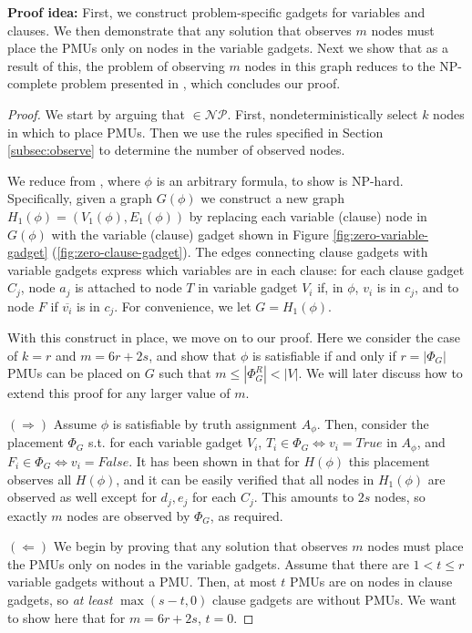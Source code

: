 {\bf Proof idea:} First, we construct problem-specific gadgets for variables and clauses. We then demonstrate that any solution that observes $m$ nodes must place the PMUs only on nodes in the variable gadgets. Next we show that as a result of this, the problem of observing $m$ nodes in this graph reduces to the NP-complete problem presented in \cite{Brueni05}, which concludes our proof.

\begin{proof}
We start by arguing that \maxinc $\in \mathcal{NP}$. First, nondeterministically select $k$ nodes in which to place PMUs. Then we use the rules specified in Section \ref{subsec:observe} to determine
the number of observed nodes. 

We reduce from \sats, where $\phi$ is an arbitrary \sat formula, to show \maxinc is NP-hard.
Specifically, given a graph $G(\phi)$ we construct a new graph $H_1(\phi) = (V_1(\phi), E_1(\phi))$ by replacing each variable 
(clause) node in $G(\phi)$ with the variable (clause) gadget shown in Figure \ref{fig:zero-variable-gadget} (\ref{fig:zero-clause-gadget}). The edges connecting clause gadgets 
with variable gadgets express which variables are in each clause: for each clause gadget $C_j$, node $a_j$ is attached to node $T$ in variable gadget $V_i$ if, in $\phi$, $v_i$ is in $c_j$,
and to node $F$ if $\overline{v_i}$ is in $c_j$. For convenience, we let $G=H_1(\phi)$.

With this construct in place, we move on to our proof. Here we consider the case of  $k=r$ and $m = 6r + 2s$, and show that $\phi$ is satisfiable if and only if $r=|\Phi_G|$ PMUs 
can be placed on $G$ such that $m \leq |\Phi^R_{G}| < |V|$. We will later discuss how to extend this proof for any larger value of $m$.  %

$(\Rightarrow)$ Assume $\phi$ is satisfiable by truth assignment $A_{\phi}$. Then, consider the placement $\Phi_G$ s.t. for each variable gadget $V_i$, $T_i\in \Phi_G \Leftrightarrow v_i=True$ 
in $A_\phi$, and  $F_i\in \Phi_G \Leftrightarrow v_i=False$. It has been shown in \cite{Brueni05} that for $H(\phi)$ this placement observes all $H(\phi)$, and it can be easily verified that
all nodes in $H_1(\phi)$ are observed as well except for $d_j, e_j$ for each $C_j$. This amounts to $2s$ nodes, so exactly $m$ nodes are observed by $\Phi_G$, as required.  

$(\Leftarrow)$ 
We begin by proving that any solution that observes $m$ nodes must place the PMUs only on nodes in the variable gadgets. Assume that there are $1<t\leq r$ variable gadgets without a PMU. 
Then, at most $t$ PMUs are on nodes in clause gadgets, so {\it at least} $\max(s-t,0)$ clause gadgets are without PMUs. We want to show here that for $m=6r+2s$, $t=0$.


\end{proof}
